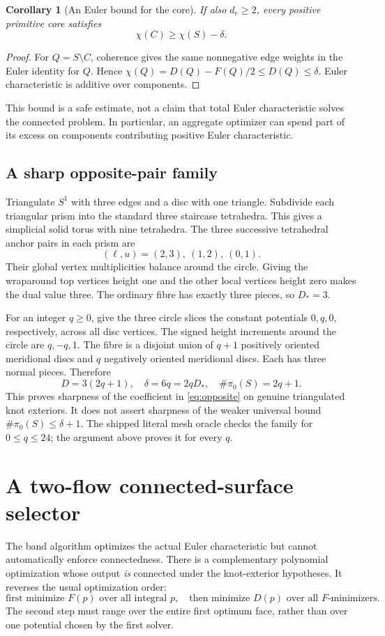 \documentclass[11pt,letterpaper]{article}
\newtheorem{corollary}[theorem]{Corollary}
\theoremstyle{definition}
\begin{document}
\begin{corollary}[An Euler bound for the core]\label{cor:coreeuler}
If also $d_e\geq2$, every positive primitive core satisfies
\[
 \chi(C)\geq\chi(S)-\delta.
\]
\end{corollary}
\begin{proof}
For $Q=S\setminus C$, coherence gives the same nonnegative edge weights in the Euler identity for $Q$. Hence $\chi(Q)=D(Q)-F(Q)/2\leq D(Q)\leq\delta$. Euler characteristic is additive over components.
\end{proof}

This bound is a safe estimate, not a claim that total Euler characteristic solves the connected problem. In particular, an aggregate optimizer can spend part of its excess on components contributing positive Euler characteristic.

\subsection{A sharp opposite-pair family}
Triangulate $S^1$ with three edges and a disc with one triangle. Subdivide each triangular prism into the standard three staircase tetrahedra. This gives a simplicial solid torus with nine tetrahedra. The three successive tetrahedral anchor pairs in each prism are
\[
 (\ell,u)=(2,3),\ (1,2),\ (0,1).
\]
Their global vertex multiplicities balance around the circle. Giving the wraparound top vertices height one and the other local vertices height zero makes the dual value three. The ordinary fibre has exactly three pieces, so $D_*=3$.

For an integer $q\geq0$, give the three circle slices the constant potentials $0,q,0$, respectively, across all disc vertices. The signed height increments around the circle are $q,-q,1$. The fibre is a disjoint union of $q+1$ positively oriented meridional discs and $q$ negatively oriented meridional discs. Each has three normal pieces. Therefore
\[
 D=3(2q+1),\quad \delta=6q=2qD_*,\quad \#\pi_0(S)=2q+1.
\]
This proves sharpness of the coefficient in \eqref{eq:opposite} on genuine triangulated knot exteriors. It does not assert sharpness of the weaker universal bound $\#\pi_0(S)\leq\delta+1$. The shipped literal mesh oracle checks the family for $0\leq q\leq24$; the argument above proves it for every $q$.

\section{A two-flow connected-surface selector}\label{sec:lex}
The band algorithm optimizes the actual Euler characteristic but cannot automatically enforce connectedness. There is a complementary polynomial optimization whose output \emph{is} connected under the knot-exterior hypotheses. It reverses the usual optimization order:
\begin{equation}\label{eq:lexgoal}
 \text{first minimize }F(p)\text{ over all integral }p,
 \quad\text{then minimize }D(p)\text{ over all }F\text{-minimizers}.
\end{equation}
The second step must range over the entire first optimum face, rather than over one potential chosen by the first solver.
\end{document}
